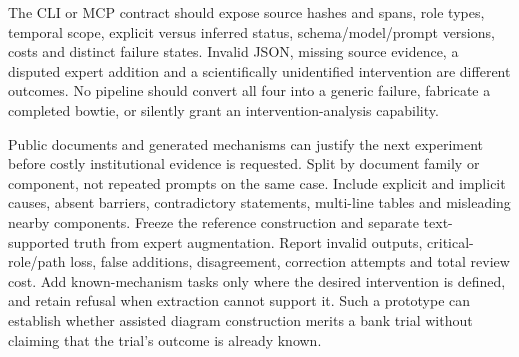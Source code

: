 The CLI or MCP contract should expose source hashes and spans, role types, temporal scope, explicit versus inferred status, schema/model/prompt versions, costs and distinct failure states. Invalid JSON, missing source evidence, a disputed expert addition and a scientifically unidentified intervention are different outcomes. No pipeline should convert all four into a generic failure, fabricate a completed bowtie, or silently grant an intervention-analysis capability.

Public documents and generated mechanisms can justify the next experiment before costly institutional evidence is requested. Split by document family or component, not repeated prompts on the same case. Include explicit and implicit causes, absent barriers, contradictory statements, multi-line tables and misleading nearby components. Freeze the reference construction and separate text-supported truth from expert augmentation. Report invalid outputs, critical-role/path loss, false additions, disagreement, correction attempts and total review cost. Add known-mechanism tasks only where the desired intervention is defined, and retain refusal when extraction cannot support it. Such a prototype can establish whether assisted diagram construction merits a bank trial without claiming that the trial's outcome is already known.~\citep{exec21_ace,exec21_ace_reference}
